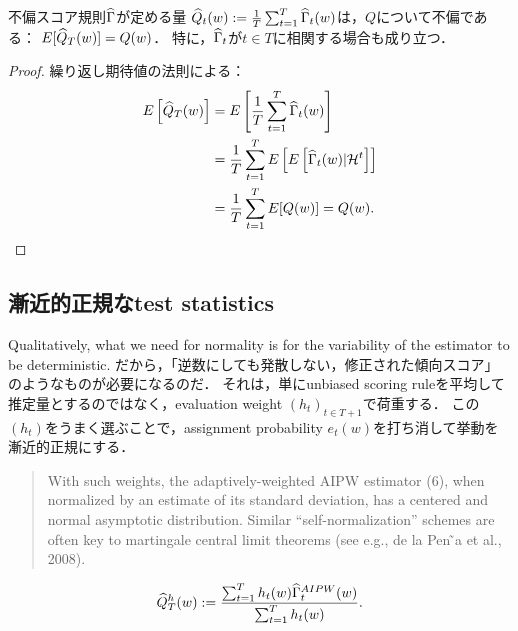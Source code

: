 \documentclass[uplatex,dvipdfmx]{jsreport}
\begin{document}
\begin{proposition}
    不偏スコア規則$\widehat{\Gamma}$が定める量
    $\widehat{Q}_t(w):=\frac{1}{T}\sum^T_{t=1}\widehat{\Gamma}_t(w)$は，$Q$について不偏である：
    $E[\widehat{Q}_T(w)]=Q(w)$．
    特に，$\widehat{\Gamma}_t$が$t\in T$に相関する場合も成り立つ．
\end{proposition}
\begin{proof}
    繰り返し期待値の法則による：
    \begin{align*}
        E\left[\widehat{Q}_T(w)\right]&=E\left[\frac{1}{T}\sum^T_{t=1}\widehat{\Gamma}_t(w)\right]\\
        &=\frac{1}{T}\sum^T_{t=1}E\left[E\left[\widehat{\Gamma}_t(w)|\mathcal{H}^t\right]\right]\\
        &=\frac{1}{T}\sum^T_{t=1}E[Q(w)]=Q(w).
    \end{align*}
\end{proof}

\subsection{漸近的正規なtest statistics}

\begin{tcolorbox}[colframe=ForestGreen, colback=ForestGreen!10!white,breakable,colbacktitle=ForestGreen!40!white,coltitle=black,fonttitle=\bfseries\sffamily,
title=]
    Qualitatively, what we need for normality is for the variability of the estimator to be deterministic.
    だから，「逆数にしても発散しない，修正された傾向スコア」のようなものが必要になるのだ．
    それは，単にunbiased scoring ruleを平均して推定量とするのではなく，evaluation weight $(h_t)_{t\in T+1}$で荷重する．
    この$(h_t)$をうまく選ぶことで，assignment probability $e_t(w)$を打ち消して挙動を漸近的正規にする．
    \begin{quote}
        With such weights, the adaptively-weighted AIPW estimator (6), when normalized by an estimate of its standard deviation, has a centered and normal asymptotic distribution. Similar “self-normalization” schemes are often key to martingale central limit theorems (see e.g., de la Pen ̃a et al., 2008).\cite{Policy Evaluation}
    \end{quote}
\end{tcolorbox}

\begin{definition}
    \[\widehat{Q}^h_T(w):=\frac{\sum^T_{t=1}h_t(w)\widehat{\Gamma}_t^{AIPW}(w)}{\sum^T_{t=1}h_t(w)}.\]
\end{definition}
\end{document}
